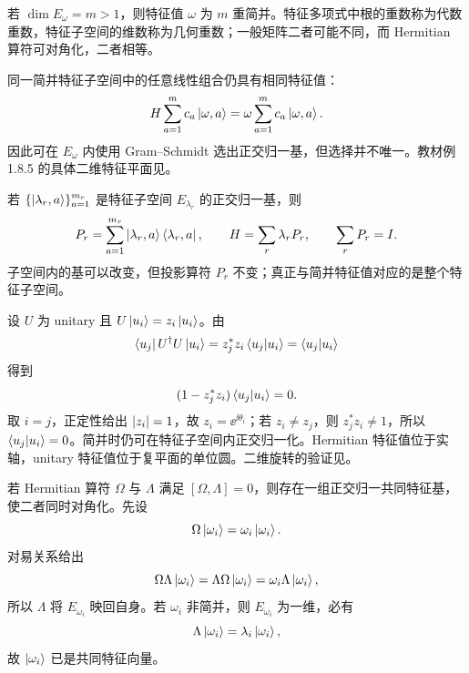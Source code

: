 
若 $\dim E_\omega=m>1$，则特征值 $\omega$ 为 $m$ 重简并。特征多项式中根的重数称为代数重数，特征子空间的维数称为几何重数；一般矩阵二者可能不同，而 Hermitian 算符可对角化，二者相等。

同一简并特征子空间中的任意线性组合仍具有相同特征值：
\[
  H\sum_{a=1}^{m}c_a\left|\omega,a\right\rangle
  =\omega\sum_{a=1}^{m}c_a\left|\omega,a\right\rangle.
\]
因此可在 $E_\omega$ 内使用 Gram--Schmidt 选出正交归一基，但选择并不唯一。教材例 1.8.5 的具体二维特征平面见。

若 $\{\left|\lambda_r,a\right\rangle\}_{a=1}^{m_r}$ 是特征子空间 $E_{\lambda_r}$ 的正交归一基，则
\begin{equation}
  P_r=\sum_{a=1}^{m_r}\left|\lambda_r,a\right\rangle\left\langle \lambda_r,a\right|,
  \qquad
  H=\sum_r\lambda_rP_r,
  \qquad
  \sum_rP_r=I.
  \label{eq:QM-C01-S08-spectral-resolution}
\end{equation}
子空间内的基可以改变，但投影算符 $P_r$ 不变；真正与简并特征值对应的是整个特征子空间。


设 $U$ 为 unitary 且 $U\left|u_i\right\rangle=z_i\left|u_i\right\rangle$。由
\[
  \left\langle u_j\right|U^\dagger U\left|u_i\right\rangle
  =z_j^*z_i\left\langle u_j \middle| u_i \right\rangle
  =\left\langle u_j \middle| u_i \right\rangle
\]
得到
\begin{equation}
  (1-z_j^*z_i)\left\langle u_j \middle| u_i \right\rangle=0.
  \label{eq:QM-C01-S08-unitary-spectrum}
\end{equation}
取 $i=j$，正定性给出 $\left|z_i\right|=1$，故 $z_i=\ee^{\ii\theta_i}$；若 $z_i\neq z_j$，则 $z_j^*z_i\neq1$，所以 $\left\langle u_j \middle| u_i \right\rangle=0$。简并时仍可在特征子空间内正交归一化。Hermitian 特征值位于实轴，unitary 特征值位于复平面的单位圆。二维旋转的验证见。


若 Hermitian 算符 $\Omega$ 与 $\Lambda$ 满足 $[\Omega,\Lambda]=0$，则存在一组正交归一共同特征基，使二者同时对角化。先设
\[
  \Omega\left|\omega_i\right\rangle=\omega_i\left|\omega_i\right\rangle.
\]
对易关系给出
\begin{equation}
  \Omega\Lambda\left|\omega_i\right\rangle
  =\Lambda\Omega\left|\omega_i\right\rangle
  =\omega_i\Lambda\left|\omega_i\right\rangle,
  \label{eq:QM-C01-S08-commuting-invariance}
\end{equation}
所以 $\Lambda$ 将 $E_{\omega_i}$ 映回自身。若 $\omega_i$ 非简并，则 $E_{\omega_i}$ 为一维，必有
\[
  \Lambda\left|\omega_i\right\rangle=\lambda_i\left|\omega_i\right\rangle,
\]
故 $\left|\omega_i\right\rangle$ 已是共同特征向量。

